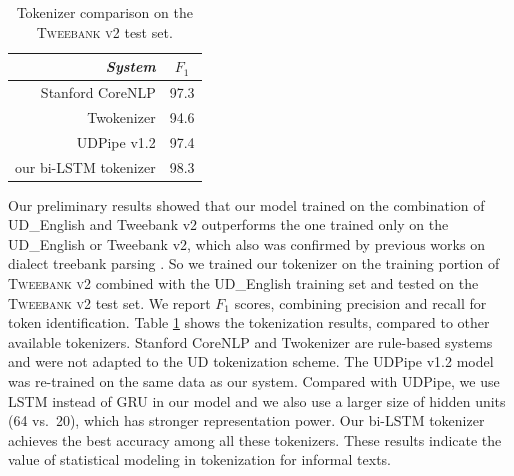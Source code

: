\documentclass[11pt,a4paper]{article}
\newcommand{\yjcomment}[1]{\textcolor{orange}{[$_\mathrm{L}^\mathrm{Y}$#1]}}
\newcommand{\yicomment}[1]{\textcolor{gray}{[#1 ---\textsc{yi}]}}
\newcommand{\nss}[1]{\textcolor{magenta}{[$_\mathrm{S}^\mathrm{NS}$#1]}}
\begin{document}
\begin{table}[t]
	\centering
	\begin{tabular}{rc}
		\hline
		\it System & $F_1$ \\
		\hline
		  Stanford CoreNLP & 97.3 \\
		 Twokenizer & 94.6 \\
		\hdashline
		UDPipe v1.2 & 97.4 \\
	 	our bi-LSTM tokenizer & 98.3 \\
		\hline
	\end{tabular}
	\caption{Tokenizer comparison on the \textsc{Tweebank v2} test set.}\label{tbl:tok-result}
\end{table}
Our preliminary results
showed that our model trained on
the combination of UD\_English and Tweebank v2
outperforms the one trained only on the UD\_English or Tweebank v2,
which also was confirmed by previous works on dialect treebank parsing \cite{wang-EtAl:2017:Long6}.
So we trained our tokenizer on the training portion of
\textsc{Tweebank v2} combined with the UD\_English training set
and tested on the \textsc{Tweebank v2} test set. %
We report $F_1$ scores, combining precision and recall for token identification. Table \ref{tbl:tok-result} shows the
tokenization results, compared to  other available tokenizers. 
 Stanford CoreNLP \cite{manning-EtAl:2014:P14-5} and Twokenizer
\cite{ICWSM101540} are rule-based systems and were not adapted
to the UD tokenization scheme.
The UDPipe v1.2
\cite{straka-strakova:2017:K17-3} model was re-trained on the same
data as our system. Compared with UDPipe, we use LSTM
instead of GRU in our model and we also use a larger size of hidden units (64 vs.~20),
which has stronger representation power. 
Our bi-LSTM tokenizer achieves the best accuracy among all these
tokenizers.  These results indicate the value of statistical modeling
in tokenization for informal texts.%
\end{document}
